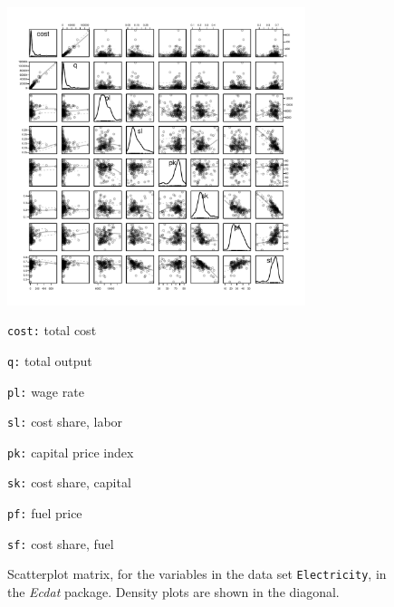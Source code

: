 \documentclass{tufte-book}\usepackage[]{graphicx}\usepackage[]{color}
\begin{document}
\begin{figure}[h]
\vspace*{-18pt}
\parbox[c]{0.7\textwidth}{
\begin{Schunk}


\centerline{\includegraphics[width=0.775\textwidth]{figs/8-Elec-spm-1} }

\end{Schunk}
}
\hspace*{0.05\textwidth}
\parbox[c]{0.23\linewidth}{
\small
\begin{list}{}{\leftmargin=2em \setlength{\itemsep}{5pt} \setlength{\parsep}{1pt}}
\setlength{\labelwidth}{3em}
\item[\texttt{cost:}]
 total cost
\item[\texttt{q:}]
 total output
\item[\texttt{pl:}]
 wage rate
\item[\texttt{sl:}]
 cost share, labor
\item[\texttt{pk:}]
 capital price index
\item[\texttt{sk:}]
 cost share,
 capital
\item[\texttt{pf:}]
 fuel price
\item[\texttt{sf:}]
 cost share, fuel
\end{list}
}
\vspace*{-9pt}

\caption{Scatterplot matrix, for the variables in the data set
  \texttt{Electricity}, in the {\em Ecdat} package. Density
  plots are shown in the diagonal.\label{fig:elec-spm}}
\end{figure}
\end{document}
